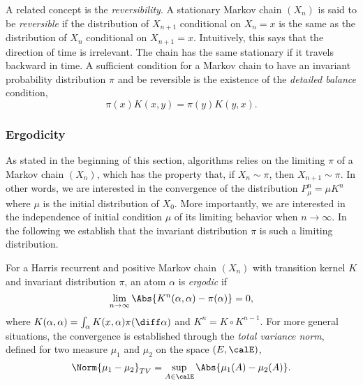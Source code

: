 A related concept is the \emph{reversibility}. A stationary Markov chain
$(X_n)$ is said to be \emph{reversible} if the distribution of $X_{n+1}$
conditional on $X_n = x$ is the same as the distribution of $X_n$ conditional
on $X_{n+1} = x$. Intuitively, this says that the direction of time is
irrelevant. The chain has the same stationary if it travels backward in time.
A sufficient condition for a Markov chain to have an invariant probability
distribution $\pi$ and be reversible is the existence of the \emph{detailed
  balance} condition,
\begin{equation}
  \pi(x)K(x,y) = \pi(y)K(y,x).
\end{equation}

\subsubsection{Ergodicity}
\label{ssub:Ergodicity}

As stated in the beginning of this section, \mcmc algorithms relies on the
limiting $\pi$ of a Markov chain $(X_n)$, which has the property that, if
$X_n\sim\pi$, then $X_{n+1}\sim\pi$. In other words, we are interested in the
convergence of the distribution $P_{\mu}^n = \mu K^n$ where $\mu$ is the
initial distribution of $X_0$. More importantly, we are interested in the
independence of initial condition $\mu$ of its limiting behavior when
$n\to\infty$. In the following we establish that the invariant distribution
$\pi$ is such a limiting distribution.

For a Harris recurrent and positive Markov chain $(X_n)$ with transition
kernel $K$ and invariant distribution $\pi$, an atom $\alpha$ is
\emph{ergodic} if
\begin{equation}
  \lim_{n\to\infty}\Abs{K^n(\alpha,\alpha) - \pi(\alpha)} = 0,
\end{equation}
where $K(\alpha,\alpha) = \int_{\alpha}K(x,\alpha)\pi(\diff\alpha)$ and $K^n =
K\vysmwhtcircle K^{n-1}$. For more general situations, the convergence is
established through the \emph{total variance norm}, defined for two measure
$\mu_1$ and $\mu_2$ on the space $(E,\calE)$,
\begin{equation}
  \Norm{\mu_1-\mu_2}_{TV} = \sup_{A\in\calE}\Abs{\mu_1(A) - \mu_2(A)}.
\end{equation}

